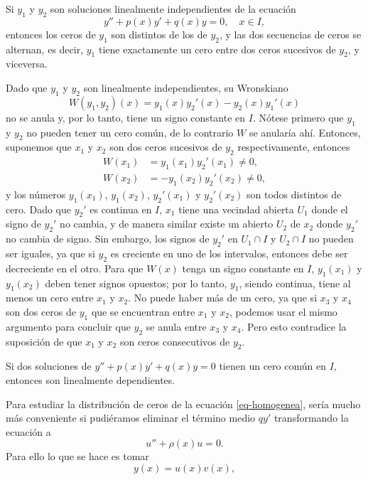 \documentclass[main.tex]{subfiles}
\begin{document}
\begin{teorema}
Si \(y_1\) y \(y_2\) son soluciones linealmente independientes de la ecuación
\[
y''+p(x)y'+q(x)y=0, \quad x\in I,
\]
entonces los ceros de \(y_1\) son distintos de los de \(y_2 \), y las dos secuencias de ceros se alternan, es decir, \(y_1\) tiene exactamente un cero entre dos ceros sucesivos de \(y_2\), y viceversa.
\end{teorema}
\dem Dado que \(y_1\) y \(y_2\) son linealmente independientes, su Wronskiano
\[
W(y_1,y_2)(x)=y_1(x)y_2'(x)-y_2(x)y_1'(x)
\]
no se anula y, por lo tanto, tiene un signo constante en \(I\). Nótese primero que \(y_1\) y \(y_2\) no pueden tener un cero común, de lo contrario \(W\) se anularía ahí. Entonces, suponemos que \(x_1\) y \(x_2\) son dos ceros sucesivos de \(y_2\) respectivamente, entonces
\begin{align*}
W(x_1)&=y_1(x_1)y_2'(x_1)\neq0,\\
W(x_2)&=-y_1(x_2) y_2'(x_2)\neq0,
\end{align*}
y los números \(y_1(x_1)\), \(y_1(x_2)\), \(y_2'(x_1)\) y \(y_2'(x_2)\) son todos distintos de cero. Dado que \(y_2'\) es continua en \(I\), \(x_1\) tiene una vecindad abierta \(U_1\) donde el signo de \(y_2'\) no cambia, y de manera similar existe un abierto \(U_2\) de \(x_2\) donde \(y_2'\) no cambia de signo. Sin embargo, los signos de \(y_2'\) en \(U_1\cap I\) y \(U_2\cap I\) no pueden ser iguales, ya que si \(y_2\) es creciente en uno de los intervalos, entonces debe ser decreciente en el otro. Para que \(W(x)\) tenga un signo constante en \(I\), \(y_1(x_1)\) y \(y_1(x_2)\) deben tener signos opuestos; por lo tanto, \(y_1\), siendo continua, tiene al menos un cero entre \(x_1\) y \(x_2\). No puede haber más de un cero, ya que si \(x_3\) y \(x_4\) son dos ceros de \(y_1\) que se encuentran entre \(x_1\) y \(x_2\), podemos usar el mismo argumento para concluir que \(y_2\) se anula entre \(x_3\) y \(x_4\). Pero esto contradice la suposición de que \(x_1\) y \(x_2\) son ceros consecutivos de \(y_2\).\QED\\
\begin{cor}
Si dos soluciones de \(y''+p(x)y'+q(x)y=0\) tienen un cero común en \(I\), entonces son linealmente dependientes.
\end{cor}
Para estudiar la distribución de ceros de la ecuación \ref{eq-homogenea}, sería mucho más conveniente si pudiéramos eliminar el término medio \(qy'\) transformando la ecuación a
\[
u''+\rho(x)u=0.
\]
Para ello lo que se hace es tomar
\[
y(x)=u(x)v(x),
\]
\end{document}
